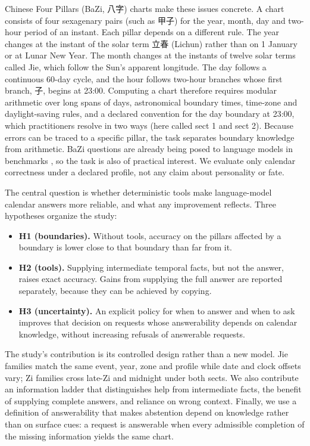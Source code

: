 \documentclass[12pt,letterpaper]{article}
\begin{document}
Chinese Four Pillars (BaZi, 八字) charts make these issues concrete. A chart consists of four sexagenary pairs (such as 甲子) for the year, month, day and two-hour period of an instant. Each pillar depends on a different rule. The year changes at the instant of the solar term 立春 (Lichun) rather than on 1 January or at Lunar New Year. The month changes at the instants of twelve solar terms called Jie, which follow the Sun's apparent longitude. The day follows a continuous 60-day cycle, and the hour follows two-hour branches whose first branch, 子, begins at 23:00. Computing a chart therefore requires modular arithmetic over long spans of days, astronomical boundary times, time-zone and daylight-saving rules, and a declared convention for the day boundary at 23:00, which practitioners resolve in two ways (here called sect 1 and sect 2). Because errors can be traced to a specific pillar, the task separates boundary knowledge from arithmetic. BaZi questions are already being posed to language models in benchmarks \citep{baziqa,detbenchmark}, so the task is also of practical interest. We evaluate only calendar correctness under a declared profile, not any claim about personality or fate.

The central question is whether deterministic tools make language-model calendar answers more reliable, and what any improvement reflects. Three hypotheses organize the study:
\begin{itemize}
\item \textbf{H1 (boundaries).} Without tools, accuracy on the pillars affected by a boundary is lower close to that boundary than far from it.
\item \textbf{H2 (tools).} Supplying intermediate temporal facts, but not the answer, raises exact accuracy. Gains from supplying the full answer are reported separately, because they can be achieved by copying.
\item \textbf{H3 (uncertainty).} An explicit policy for when to answer and when to ask improves that decision on requests whose answerability depends on calendar knowledge, without increasing refusals of answerable requests.
\end{itemize}

The study's contribution is its controlled design rather than a new model. Jie families match the same event, year, zone and profile while date and clock offsets vary; Zi families cross late-Zi and midnight under both sects. We also contribute an information ladder that distinguishes help from intermediate facts, the benefit of supplying complete answers, and reliance on wrong context. Finally, we use a definition of answerability that makes abstention depend on knowledge rather than on surface cues: a request is answerable when every admissible completion of the missing information yields the same chart.
\end{document}
